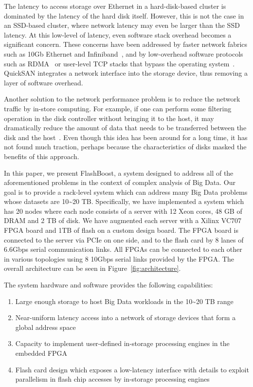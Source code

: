 The latency to access storage over Ethernet in a hard-disk-based cluster is
dominated by the latency of the hard disk itself. However, this is not the case
in an SSD-based cluster, where network latency may even be larger than the SSD
latency. At this low-level of latency, even software stack overhead becomes a
significant concern. These concerns have been addressed by faster network
fabrics such as 10Gb Ethernet and Infiniband~\cite{infiniband}, and by low-overhead
software protocols such as RDMA~\cite{rdmampi} or user-level TCP stacks that bypass the
operating system~\cite{usertcp}. QuickSAN integrates a network interface into the
storage device, thus removing a layer of software overhead.

Another solution to the network performance problem is to reduce the network
traffic by in-store computing. For example, if one can perform some filtering
operation in the disk controller without bringing it to the host, it may
dramatically reduce the amount of data that needs to be transferred between the
disk and the host~\cite{idisk,netezza,smartssdquery}. Even though this idea has been
around for a long time, it has not found much traction, perhaps because the
characteristics of disks masked the benefits of this approach.  

In this paper, we present FlashBoost, a system designed to address all of the
aforementioned problems in the context of complex analysis of Big Data. Our goal
is to provide a rack-level system which can address many Big Data problems whose
datasets are 10\textasciitilde20 TB. Specifically, we have implemented a system which has 20
nodes where each node consists of a server with 12 Xeon cores, 48 GB of DRAM and
2 TB of disk. We have augmented each server with a Xilinx VC707 FPGA board and
1TB of flash on a custom design board. The FPGA board is connected to the server
via PCIe on one side, and to the flash card by 8 lanes of 6.6Gbps serial
communication links. All FPGAs can be connected to each other in various
topologies using 8 10Gbps serial links provided by the FPGA. The overall
architecture can be seen in Figure~\ref{fig:architecture}.

The system hardware and software provides the following capabilities:
\begin{enumerate}
\item Large enough storage to host Big Data workloads in the 10\textasciitilde20 TB range
\item Near-uniform latency access into a network of storage devices that form a
global address space
\item Capacity to implement user-defined in-storage processing engines in the
embedded FPGA
\item Flash card design which exposes a low-latency interface with details to
exploit parallelism in flash chip accesses by in-storage processing engines
\end{enumerate}


